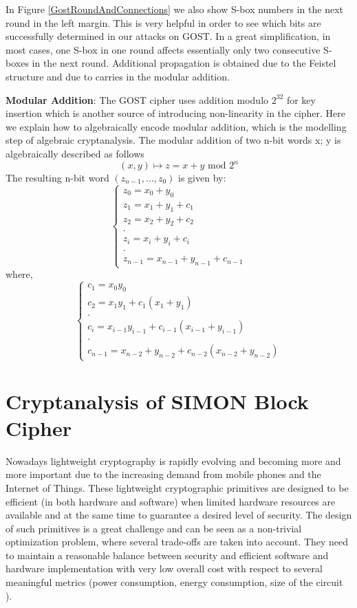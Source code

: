 In Figure \ref{GostRoundAndConnections}
we also show S-box numbers
in the next round in the left margin.
This is very helpful in order to see which bits are successfully determined in our attacks on GOST.
In a great simplification, in most cases, one S-box in one round affects essentially
only two consecutive S-boxes in the next round. Additional propagation is obtained due to the Feistel structure
and due to carries in the modular addition.

\textbf{Modular Addition}: The GOST cipher uses addition modulo $2^{32}$ for key insertion which is another source of introducing non-linearity in the cipher. Here we explain how to algebraically encode modular addition, which is the modelling step of algebraic cryptanalysis. The modular addition of two n-bit words x; y is algebraically
described as follows
\begin{equation}
	(x,y) \mapsto z = x + y \text{ mod } 2^{n}
\end{equation}
The resulting n-bit word $(z_{n-1},...,z_{0})$ is given by:
\[
\left\{
\begin{array}{ll}
z_0 = x_0+y_0\\
z_1 = x_1+y_1+c_1\\
z_2 = x_2+y_2+c_2\\
.\\
z_i=x_i+y_i+c_i \\
.\\
z_{n-1} = x_{n-1} + y_{n-1}+c_{n-1}
\end{array}
\right.
\]
where,
\[
\left\{
\begin{array}{ll}
c_1 = x_0  y_0\\
c_2 = x_1 y_1+c_1(x_1+y_1)\\
.\\
c_i=x_{i-1}y_{i-1}+c_{i-1}(x_{i-1}+y_{i-1})\\
.\\
c_{n-1} = x_{n-2}+y_{n-2}+c_{n-2}(x_{n-2}+y_{n-2}) 
\end{array}
\right.
\]

\section{Cryptanalysis of SIMON Block Cipher}
Nowadays lightweight cryptography is rapidly evolving and becoming more and more important due to the increasing demand from mobile phones and the Internet of Things. These lightweight cryptographic primitives are designed to
be efficient (in both hardware and software) when limited
hardware resources are available and at the same time to
guarantee a desired level of security. The
design of such primitives is a great challenge and can be
seen as a non-trivial optimization problem, where several
trade-offs are taken into account. They need to maintain
a reasonable balance between security and efficient software and hardware
implementation with very low overall cost with respect to several
meaningful metrics (power consumption, energy consumption, size of the circuit \cite{OptimiPaper,BoyarPeraltaMCMethod,BoyarPeraltaMCBoolean}).

